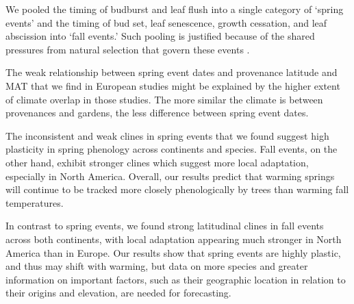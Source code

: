 \documentclass{article}
\begin{document}
We pooled the timing of budburst and leaf flush into a single category of ‘spring events’ and the timing of bud set, leaf senescence, growth cessation, and leaf abscission into ‘fall events.’ Such pooling is justified because of the shared pressures from natural selection that govern these events \citep{Gill15}. 

The weak relationship between spring event dates and provenance latitude and MAT that we find in European studies might be explained by the higher extent of climate overlap in those studies. The more similar the climate is between provenances and gardens, the less difference between spring event dates.

The inconsistent and weak clines in spring events that we found suggest high plasticity in spring phenology across continents and species. Fall events, on the other hand, exhibit stronger clines which suggest more local adaptation, especially in North America. Overall, our results predict that warming springs will continue to be tracked more closely phenologically by trees than warming fall temperatures.

In contrast to spring events, we found strong latitudinal clines in fall events across both continents, with local adaptation appearing much stronger in North America than in Europe. Our results show that spring events are highly plastic, and thus may shift with warming, but data on more species and greater information on important factors, such as their geographic location in relation to their origins and elevation, are needed for forecasting. 
\end{document}
